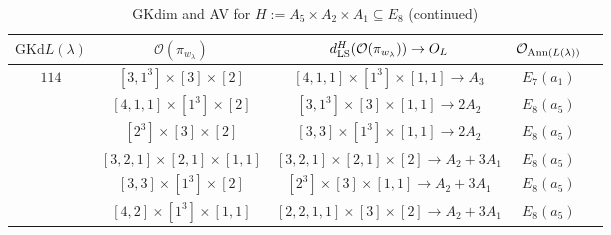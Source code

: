 \documentclass[reqno,12pt]{amsart}
\numberwithin{equation}{section}
\theoremstyle{plain}
\theoremstyle{definition}
\newcommand{\lam}{\lambda}
\renewcommand{\subset}{\subseteq}
\begin{document}
\begin{table}[htbp]
{\begin{tabular}{|c|c|c|c|c|}
	\end{tabular}}
	\bigskip
	
\end{table}


\begin{table}[htbp]\caption{ GKdim and AV for $H:=A_5\times A_2\times A_1\subset E_8$ (continued)}
	\label{taba5a2a1-2}
	\centering
	\renewcommand{\arraystretch}{1.5}
	\setlength\tabcolsep{5pt}
	
\small	\begin{tabular}{|c|c|c|c|c|}
		\hline $\mathrm{GKd} L(\lambda)$ &    $\mathcal{O}({\pi_{w_{\lam}}})$& $d_{\rm LS}^{H}(\mathcal{O}(\pi_{w_\lambda}))\rightarrow   O_{L}$ & $\mathcal{O}_{{\rm Ann}(L(\lambda))}$ \\ \hline

$114$ &    $ [3,1^3]\times [3]\times [2] $  &$[4,1,1]\times [1^3]\times [1,1]\rightarrow      A_3 $  &   $E_7(a_1) $  \\
&  $ [4,1,1]\times [1^3]\times [2] $  &$[3,1^3]\times [3]\times [1,1]\rightarrow      2A_2 $  &   $E_8(a_5) $  \\
&  $ [2^3]\times [3]\times [2] $  &$[3,3]\times [1^3]\times [1,1]\rightarrow      2A_2 $  &   $E_8(a_5) $  \\
&  $ [3,2,1]\times [2,1]\times [1,1] $  &$[3,2,1]\times [2,1]\times [2]\rightarrow      A_2+3A_1 $  &   $E_8(a_5) $  \\


&  $ [3,3]\times [1^3]\times [2] $  &$[2^3]\times [3]\times [1,1]\rightarrow      A_2+3A_1 $  &   $E_8(a_5) $  \\
&  $ [4,2]\times [1^3]\times [1,1] $  &$[2,2,1,1]\times [3]\times [2]\rightarrow      A_2+3A_1 $  &   $E_8(a_5) $  \\
\hline





\end{tabular}
\end{table}
\end{document}
